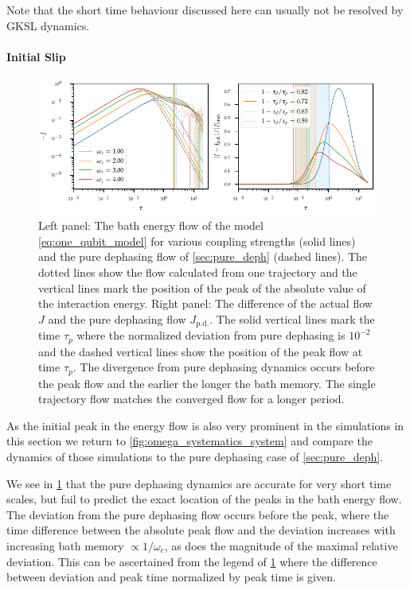 Note that the short time behaviour discussed here can usually not be
resolved by GKSL dynamics.

\paragraph{Initial Slip}
\begin{figure}[htp]
  \centering
  \includegraphics{figs/one_bath_syst/omega_initial_slip}
  \caption{\label{fig:omega_initial_slip} Left panel: The bath energy
    flow of the model \cref{eq:one_qubit_model} for various coupling
    strengths (solid lines) and the pure dephasing flow of
    \cref{sec:pure_deph} (dashed lines). The dotted lines show the
    flow calculated from one trajectory and the vertical lines mark
    the position of the peak of the absolute value of the interaction
    energy. Right panel: The difference of the actual flow \(J\) and
    the pure dephasing flow \(J_\mathrm{p.d.}\). The solid vertical
    lines mark the time \(τ_p\) where the normalized deviation from
    pure dephasing is \(10^{-2}\) and the dashed vertical lines show
    the position of the peak flow at time \(τ_p\). The divergence from
    pure dephasing dynamics occurs before the peak flow and the
    earlier the longer the bath memory. The single trajectory flow
    matches the converged flow for a longer period.}
\end{figure}

As the initial peak in the energy flow is also very prominent in the
simulations in this section we return to
\cref{fig:omega_systematics_system} and compare the dynamics of those
simulations to the pure dephasing case of \cref{sec:pure_deph}.

We see in \cref{fig:omega_initial_slip} that the pure dephasing
dynamics are accurate for very short time scales, but fail to predict
the exact location of the peaks in the bath energy flow. The deviation
from the pure dephasing flow occurs before the peak, where the time
difference between the absolute peak flow and the deviation increases
with increasing bath memory \(\propto 1/ω_c\), as does the magnitude
of the maximal relative deviation. This can be ascertained from the
legend of \cref{fig:omega_initial_slip} where the difference between
deviation and peak time normalized by peak time is given.

